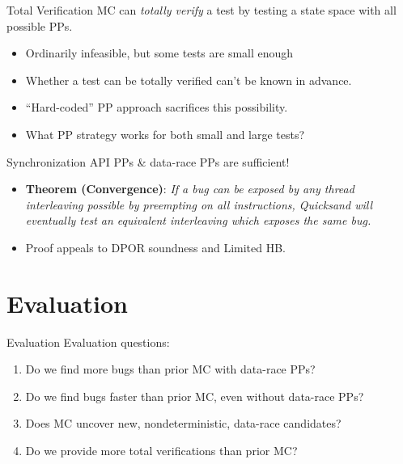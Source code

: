 \documentclass[xcolor=dvipsnames]{beamer}
\begin{document}
\begin{frame}{Total Verification}
	MC can {\em totally verify} a test by testing a state space with all possible PPs.
	\begin{itemize}
		\item Ordinarily infeasible, but some tests are small enough
		\item Whether a test can be totally verified can't be known in advance.
		\item ``Hard-coded'' PP approach sacrifices this possibility.
		\item What PP strategy works for both small and large tests?
	\end{itemize}
	\pause
	\linegap

	Synchronization API PPs \& data-race PPs are sufficient!
	\begin{itemize}
		\item {\bf Theorem (Convergence)}:
			{\em If a bug can be exposed by any thread interleaving
				possible by preempting on all instructions,
			Quicksand will eventually test an equivalent interleaving which exposes the same bug.}
		\item Proof appeals to DPOR soundness and Limited HB.
	\end{itemize}
\end{frame}



\section{Evaluation}


\begin{frame}{Evaluation}
	Evaluation questions:
	\begin{enumerate}
		\item Do we find more bugs than prior MC with data-race PPs?
		\item Do we find bugs faster than prior MC, even without data-race PPs?
		\item Does MC uncover new, nondeterministic, data-race candidates?
		\item Do we provide more total verifications than prior MC?
	\end{enumerate}
\end{frame}
\end{document}

